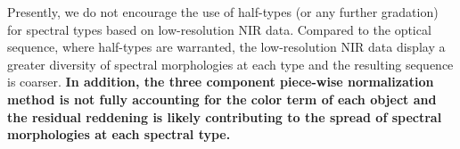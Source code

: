 \documentclass[12pt]{aastex6}
\begin{document}

Presently, we do not encourage the use of half-types (or any further gradation) for spectral types based on low-resolution NIR data.
Compared to the optical sequence, where half-types are warranted, the low-resolution NIR data display a greater diversity of spectral morphologies at each type and the resulting sequence is coarser.
\textbf{In addition, the three component piece-wise normalization method is not fully accounting for the color term of each object and the residual reddening is likely contributing to the spread of spectral morphologies at each spectral type.}

\end{document}
